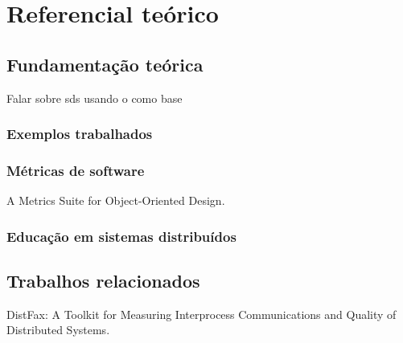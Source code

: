 \chapter{Referencial teórico}
\label{cap:referencialTeorico}


\section{Fundamentação teórica}
\label{section:background}
Falar sobre \gls{sds} usando o \cite{DistributedSystemsCoulouris} como base


\subsection{Exemplos trabalhados}

\cite{Robert.Atkinson-etal:2000}

\cite{Skudder-LuxtonReilly:2014}

\cite{Simone.Tonhao-etal:2021}
\cite{Simone.Tonhao-etal:2022}
\cite{Tiago.Bonetti-etal:2023}


\subsection{Métricas de software}

A Metrics Suite for Object-Oriented Design.
\cite{MetricsSuite}

\subsection{Educação em sistemas distribuídos}


\section{Trabalhos relacionados}
\label{section:related-work}

DistFax: A Toolkit for Measuring Interprocess Communications and Quality of Distributed Systems.
\cite{DistFax}
